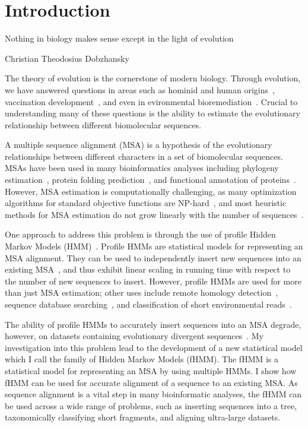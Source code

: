\chapter{Introduction}\label{intro}
%
\epigraph{Nothing in biology makes sense except in the light of evolution}{Christian Theodosius Dobzhansky}

The theory of evolution is the cornerstone of modern biology.  Through evolution, we have answered questions in areas such as hominid and human origins~\cite{Martin1990,Takahata1997}, vaccination development~\cite{Wilder-Smith2010,Fitch1993}, and even in evironmental bioremediation~\cite{Liu1993}.  Crucial to understanding many of these questions is the ability to estimate the evolutionary relationship between different biomolecular sequences.

A multiple sequence alignment (MSA) is a hypothesis of the evolutionary relationships between different characters in a set of biomolecular sequences.  MSAs have been used in many bioinformatics analyses including phylogeny estimation~\cite{Holder2003}, protein folding prediction~\cite{Karplus2009}, and functional annotation of proteins~\cite{Finn2010}.  However, MSA estimation is computationally challenging, as many optimization algorithms for standard objective functions are NP-hard~\cite{Wang1994,Bonizzoni2001}, and most heuristic methods for MSA estimation do not grow linearly with the number of sequences~\cite{Notredame2002}.

One approach to address this problem is through the use of profile Hidden Markov Models (HMM)~\cite{Eddy1998}.  Profile HMMs are statistical models for representing an MSA alignment.  They can be used to independently insert new sequences into an existing MSA~\cite{Eddy1998}, and thus exhibit linear scaling in running time with respect to the number of new sequences to insert.  However, profile HMMs are used for more than just MSA estimation; other uses include remote homology detection~\cite{Finn2010}, sequence database searching~\cite{Punta2012}, and classification of short environmental reads~\cite{Gerlach2011}.  

The ability of profile HMMs to accurately insert sequences into an MSA degrade, however, on datasets containing evolutionary divergent sequences~\cite{Moriyama2006,Finn2010}.  My investigation into this problem lead to the development of a new statistical model which I call the family of Hidden Markov Models (fHMM).  The fHMM is a statistical model for representing an MSA by using multiple HMMs.  I show how fHMM can be used for accurate alignment of a sequence to an existing MSA.  As sequence alignment is a vital step in many bioinformatic analyses, the fHMM can be used across a wide range of problems, such as inserting sequences into a tree, taxonomically classifying short fragments, and aligning ultra-large datasets.

